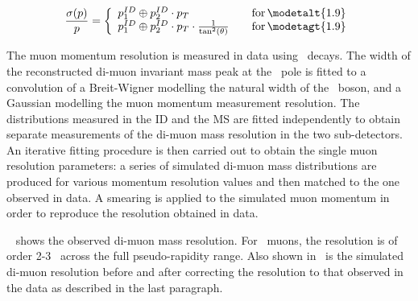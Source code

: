 \begin{equation}
\frac{ \sigma (p) }{ p } = \left\{
    \begin{array}{l l}
        p_{1}^{ID} \oplus  p_{2}^{ID} \cdot p_{T}  & \quad {\rm
for}\, \modetalt{1.9} \\
    p_{1}^{ID} \oplus  p_{2}^{ID} \cdot p_{T} \cdot
\frac{1}{\tan ^{2} (\theta)}  & \quad {\rm for}\, \modetagt{1.9} \\
  \end{array} \right.
\end{equation}

The muon momentum resolution is measured in data using \Zmm\ decays. The width
of the reconstructed di-muon invariant mass peak at the \Z\ pole is fitted to a
convolution of a Breit-Wigner modelling the natural width of the \Z\ boson, and
a Gaussian modelling the muon momentum measurement resolution. The distributions
measured in the ID and the MS are fitted independently to obtain separate
measurements of the di-muon mass resolution in the two sub-detectors.  An
iterative fitting procedure is then carried out to obtain the single muon
resolution parameters: a series of simulated di-muon mass distributions are
produced for various momentum resolution values and then matched to the one
observed in data.  A smearing is applied to the simulated muon momentum in order
to reproduce the resolution obtained in data. 

%
%
%



~ shows the observed di-muon mass resolution. For
\combined\ muons, the resolution is of order 2-3 \gev\ across the full
pseudo-rapidity range. Also shown in~ is the simulated
di-muon resolution before and after correcting the resolution to that observed
in the data as described in the last paragraph.

